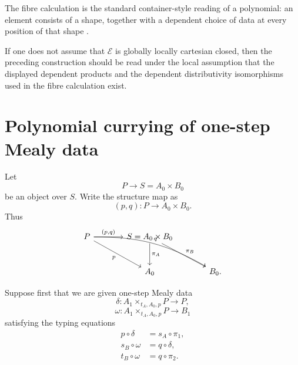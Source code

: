 \begin{remark}
\label{rem:container-reading-fibre-calculation}
The fibre calculation is the standard container-style reading of a
polynomial: an element consists of a shape, together with a dependent
choice of data at every position of that shape
\cite{AbbottAltenkirchGhaniContainers,GambinoKockPolynomialFunctorsMonads}.
\end{remark}

\begin{remark}
\label{rem:local-polynomial-hypotheses}
If one does not assume that \(\mathcal E\) is globally locally cartesian
closed, then the preceding construction should be read under the local
assumption that the displayed dependent products and the dependent
distributivity isomorphisms used in the fibre calculation exist.
\end{remark}

\section{Polynomial currying of one-step Mealy data}
\label{sec:polynomial-currying-one-step-mealy-data}

Let
\[
P\to S=A_0\times B_0
\]
be an object over \(S\). Write the structure map as
\[
(p,q):P\to A_0\times B_0.
\]
Thus
\[
\begin{tikzcd}[column sep=large,row sep=large]
P
  \arrow[r, "{(p,q)}"]
  \arrow[dr, "p"']
  \arrow[drr, bend left=15, "q"]
&
S=A_0\times B_0
  \arrow[d, "\pi_A"]
  \arrow[dr, "\pi_B"]
&
\\
&
A_0
&
B_0 .
\end{tikzcd}
\]

Suppose first that we are given one-step Mealy data
\[
\delta:
A_1\times_{t_A,A_0,p}P\to P,
\]
\[
\omega:
A_1\times_{t_A,A_0,p}P\to B_1
\]
satisfying the typing equations
\begin{align}
p\circ\delta&=s_A\circ\pi_1,
\label{eq:poly-curry-pdelta}
\\
s_B\circ\omega&=q\circ\delta,
\label{eq:poly-curry-source-output}
\\
t_B\circ\omega&=q\circ\pi_2.
\label{eq:poly-curry-target-output}
\end{align}

